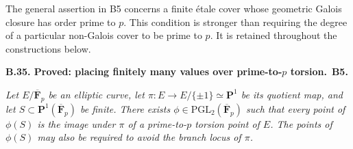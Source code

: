 \documentclass[11pt,a4paper]{article}
\newcommand{\F}{\mathbf F}
\newenvironment{claim}[3]{\par\medskip\noindent\hypertarget{#1}{\textbf{#1. #2.}}\ \textbf{#3.}\par\nopagebreak\smallskip\begingroup\itshape}{\endgroup\par\smallskip}
\begin{document}
The general assertion in B5 concerns a finite \'etale cover whose
geometric Galois closure has order prime to $p$. This condition is
stronger than requiring the degree of a particular non-Galois cover
to be prime to $p$. It is retained throughout the constructions below.

\begin{claim}{B.35}{Proved: placing finitely many values over prime-to-$p$ torsion}{B5}
Let $E/\overline{\F}_p$ be an elliptic curve, let
$\pi:E\to E/\{\pm1\}\simeq\mathbf P^1$ be its quotient map, and
let $S\subset\mathbf P^1(\overline{\F}_p)$ be finite. There exists
$\phi\in\mathrm{PGL}_2(\overline{\F}_p)$ such that every point of
$\phi(S)$ is the image under $\pi$ of a prime-to-$p$ torsion point
of $E$. The points of $\phi(S)$ may also be required to avoid the
branch locus of $\pi$.
\end{claim}
\end{document}
